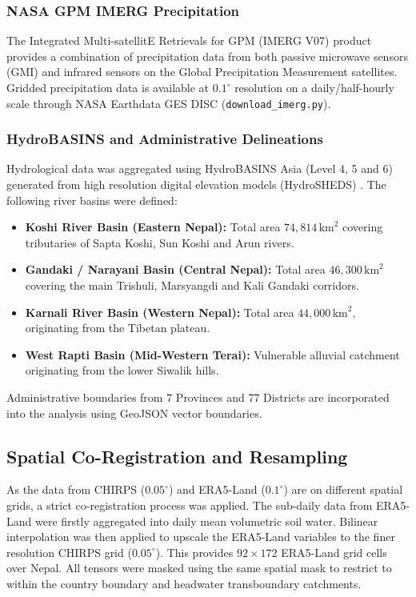 \documentclass[journal]{IEEEtran}
\begin{document}
\subsubsection{NASA GPM IMERG Precipitation}
The Integrated Multi-satellitE Retrievals for GPM (IMERG V07) \cite{huffman2020integrated} product provides a combination of precipitation data from both passive microwave sensors (GMI) and infrared sensors on the Global Precipitation Measurement satellites. Gridded precipitation data is available at $0.1^\circ$ resolution on a daily/half-hourly scale through NASA Earthdata GES DISC (\texttt{download\_imerg.py}).

\subsubsection{HydroBASINS and Administrative Delineations}
Hydrological data was aggregated using HydroBASINS Asia (Level 4, 5 and 6) generated from high resolution digital elevation models (HydroSHEDS) \cite{lehner2013global}. The following river basins were defined:
\begin{itemize}
\item \textbf{Koshi River Basin (Eastern Nepal):} Total area $74{,}814\,\text{km}^2$ covering tributaries of Sapta Koshi, Sun Koshi and Arun rivers.
\item \textbf{Gandaki / Narayani Basin (Central Nepal):} Total area $46{,}300\,\text{km}^2$ covering the main Trishuli, Marsyangdi and Kali Gandaki corridors.
\item \textbf{Karnali River Basin (Western Nepal):} Total area $44{,}000\,\text{km}^2$, originating from the Tibetan plateau.
\item \textbf{West Rapti Basin (Mid-Western Terai):} Vulnerable alluvial catchment originating from the lower Siwalik hills.
\end{itemize}
Administrative boundaries from 7 Provinces and 77 Districts are incorporated into the analysis using GeoJSON vector boundaries.

\subsection{Spatial Co-Registration and Resampling}
As the data from CHIRPS ($0.05^\circ$) and ERA5-Land ($0.1^\circ$) are on different spatial grids, a strict co-registration process was applied. The sub-daily data from ERA5-Land were firstly aggregated into daily mean volumetric soil water. Bilinear interpolation was then applied to upscale the ERA5-Land variables to the finer resolution CHIRPS grid ($0.05^\circ$). This provides $92 \times 172$ ERA5-Land grid cells over Nepal. All tensors were masked using the same spatial mask to restrict to within the country boundary and headwater transboundary catchments.
\end{document}
